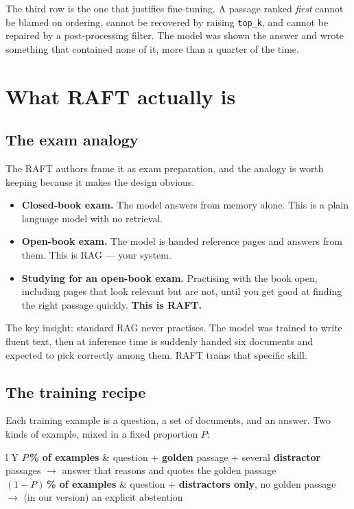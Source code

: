 \documentclass[11pt,a4paper]{article}
\begin{document}
The third row is the one that justifies fine-tuning. A passage ranked \emph{first}
cannot be blamed on ordering, cannot be recovered by raising \texttt{top\_k}, and
cannot be repaired by a post-processing filter. The model was shown the answer and
wrote something that contained none of it, more than a quarter of the time.

\section{What RAFT actually is}

\subsection{The exam analogy}

The RAFT authors frame it as exam preparation, and the analogy is worth keeping
because it makes the design obvious.

\begin{itemize}[leftmargin=1.4em]
  \item \textbf{Closed-book exam.} The model answers from memory alone. This is a
        plain language model with no retrieval.
  \item \textbf{Open-book exam.} The model is handed reference pages and answers
        from them. This is RAG --- your system.
  \item \textbf{Studying for an open-book exam.} Practising with the book open,
        including pages that look relevant but are not, until you get good at
        finding the right passage quickly. \textbf{This is RAFT.}
\end{itemize}

The key insight: standard RAG never practises. The model was trained to write
fluent text, then at inference time is suddenly handed six documents and expected
to pick correctly among them. RAFT trains that specific skill.

\subsection{The training recipe}

Each training example is a question, a set of documents, and an answer. Two kinds
of example, mixed in a fixed proportion $P$:

\begin{table}[h]\centering\small
\begin{tabularx}{\textwidth}{l Y}
\toprule
\textbf{$P$\,\% of examples} & question + \textbf{golden} passage + several \textbf{distractor} passages
$\rightarrow$ answer that reasons and quotes the golden passage \\
 \textbf{$(1-P)$\,\% of examples} & question + \textbf{distractors only}, no golden passage
$\rightarrow$ (in our version) an explicit abstention \\
\bottomrule
\end{tabularx}
\end{table}
\end{document}
